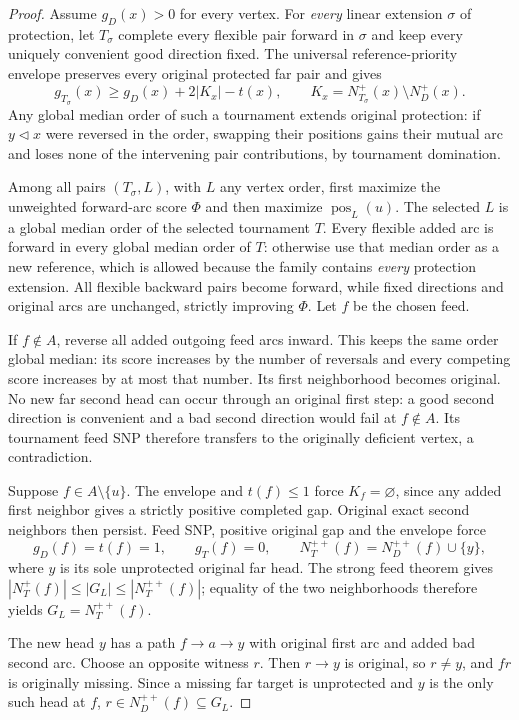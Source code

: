 \begin{proof}
Assume $g_D(x)>0$ for every vertex. For \emph{every} linear extension
$\sigma$ of protection, let $T_\sigma$ complete every flexible pair
forward in $\sigma$ and keep every uniquely convenient good direction
fixed. The universal reference-priority envelope preserves every
original protected far pair and gives
\[
 g_{T_\sigma}(x)\ge g_D(x)+2|K_x|-t(x),\qquad
 K_x=N_{T_\sigma}^+(x)\setminus N_D^+(x).
 \tag{SX1}\label{eq:one-exception-short-envelope}
\]
Any global median order of such a tournament extends original
protection: if $y\triangleleft x$ were reversed in the order, swapping
their positions gains their mutual arc and loses none of the intervening
pair contributions, by tournament domination.

Among all pairs $(T_\sigma,L)$, with $L$ any vertex order, first
maximize the unweighted forward-arc score $\Phi$ and then maximize
$\operatorname{pos}_L(u)$. The selected $L$ is a global median order
of the selected tournament $T$. Every flexible added arc is forward
in every global median order of $T$: otherwise use that median order
as a new reference, which is allowed because the family contains
\emph{every} protection extension. All flexible backward pairs become
forward, while fixed directions and original arcs are unchanged,
strictly improving $\Phi$. Let $f$ be the chosen feed.

If $f\notin A$, reverse all added outgoing feed arcs inward. This
keeps the same order global median: its score increases by the number
of reversals and every competing score increases by at most that
number. Its first neighborhood becomes original. No new far second
head can occur through an original first step: a good second direction
is convenient and a bad second direction would fail at $f\notin A$.
Its tournament feed SNP therefore transfers to the originally deficient
vertex, a contradiction.

Suppose $f\in A\setminus\{u\}$. The envelope and $t(f)\le1$ force
$K_f=\varnothing$, since any added first neighbor gives a strictly
positive completed gap. Original exact second neighbors then persist.
Feed SNP, positive original gap and the envelope force
\[
 g_D(f)=t(f)=1,\qquad g_T(f)=0,
 \qquad N_T^{++}(f)=N_D^{++}(f)\cup\{y\},
\]
where $y$ is its sole unprotected original far head. The strong feed
theorem gives $|N_T^+(f)|\le|G_L|\le|N_T^{++}(f)|$; equality of the
two neighborhoods therefore yields $G_L=N_T^{++}(f)$.

The new head $y$ has a path $f\to a\to y$ with original first arc
and added bad second arc. Choose an opposite witness $r$. Then
$r\to y$ is original, so $r\ne y$, and $fr$ is originally missing.
Since a missing far target is unprotected and $y$ is the only such
head at $f$, $r\in N_D^{++}(f)\subseteq G_L$.


\end{proof}
